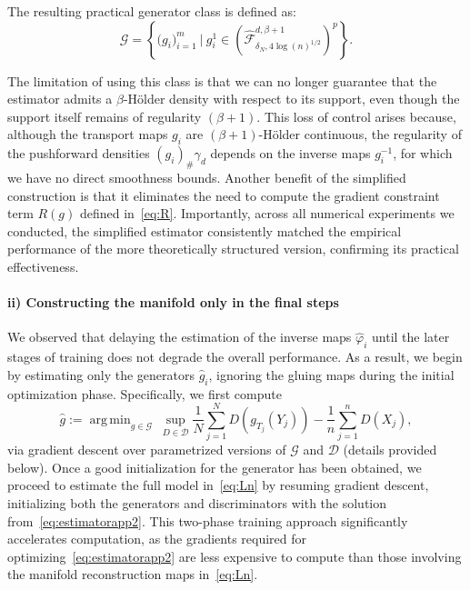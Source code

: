 \documentclass[10pt]{article}
\DeclareMathOperator*{\argmin}{arg\,min}
\begin{document}
The resulting practical generator class is defined as:
\begin{equation}\label{eq:classofgenepractice}
    \mathcal{G} = \left\{\big(g_i\big)_{i=1}^m\ \Big|\ g_i^1\in \left(\hat{\mathcal{F}}_{\delta_N,4\log(n)^{1/2}}^{d,\beta+1}\right)^{p}\right\}.
\end{equation}

The limitation of using this class is that we can no longer guarantee that the estimator admits a \( \beta \)-Hölder density with respect to its support, even though the support itself remains of regularity \( (\beta+1) \). This loss of control arises because, although the transport maps $g_i$ are \( (\beta+1) \)-Hölder continuous, the regularity of the pushforward densities \( (g_i)_{\#} \gamma_d \) depends on the inverse maps \( g_i^{-1} \), for which we have no direct smoothness bounds. 
Another benefit of the simplified construction is that it eliminates the need to compute the gradient constraint term \( R(g) \) defined in~\eqref{eq:R}. 
Importantly, across all numerical experiments we conducted, the simplified estimator consistently matched the empirical performance of the more theoretically structured version, confirming its practical effectiveness.
\paragraph{ii) Constructing the manifold only in the final steps}
We observed that delaying the estimation of the inverse maps \( \hat{\varphi}_i \) until the later stages of training does not degrade the overall performance. As a result, we begin by estimating only the generators \( \hat{g}_i \), ignoring the gluing maps during the initial optimization phase. Specifically, we first compute
\begin{equation}\label{eq:estimatorapp2}
    \hat{g}:= \argmin_{g\in \mathcal{G}}\ \sup_{D\in \mathcal{D}} 
    \frac{1}{N} \sum_{j=1}^N D( g_{T_j}(Y_j))-\frac{1}{n} \sum_{j=1}^n D(X_j),
\end{equation}
via gradient descent over parametrized versions of \( \mathcal{G} \) and \( \mathcal{D} \) (details provided below). Once a good initialization for the generator has been obtained, we proceed to estimate the full model in~\eqref{eq:Ln} by resuming gradient descent, initializing both the generators and discriminators with the solution from~\eqref{eq:estimatorapp2}. This two-phase training approach significantly accelerates computation, as the gradients required for optimizing~\eqref{eq:estimatorapp2} are less expensive to compute than those involving the manifold reconstruction maps in~\eqref{eq:Ln}.
\end{document}
